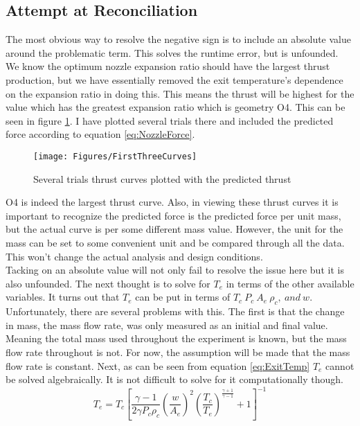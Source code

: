 \subsection{Attempt at Reconciliation}
The most obvious way to resolve the negative sign is to include an absolute value around the problematic term. This solves the runtime error, but is unfounded. We know the optimum nozzle expansion ratio should have the largest thrust production, but we have essentially removed the exit temperature's dependence on the expansion ratio in doing this. This means the thrust will be highest for the value which has the greatest expansion ratio which is geometry O4. This can be seen in figure \ref{fig:FirstThreeCurves}. I have plotted several trials there and included the predicted force according to equation \ref{eq:NozzleForce}.
\begin{figure}[h!]
\centering
\texttt{[image: Figures/FirstThreeCurves]}
\caption{Several trials thrust curves plotted with the predicted thrust}
\label{fig:FirstThreeCurves}
\end{figure}
O4 is indeed the largest thrust curve. Also, in viewing these thrust curves it is important to recognize the predicted force is the predicted force per unit mass, but the actual curve is per some different mass value. However, the unit for the mass can be set to some convenient unit and be compared through all the data. This won't change the actual analysis and design conditions.\\
Tacking on an absolute value will not only fail to resolve the issue here but it is also unfounded. The next thought is to solve for $T_e$ in terms of the other available variables. It turns out that $T_e$ can be put in terms of $T_c\ P_c\ A_e\ \rho_c,\ and\ w$.%
Unfortunately, there are several problems with this. The first is that the change in mass, the mass flow rate, was only measured as an initial and final value. Meaning the total mass used throughout the experiment is known, but the mass flow rate throughout is not. For now, the assumption will be made that the mass flow rate is constant. Next, as can be seen from equation \ref{eq:ExitTemp} $T_e$ cannot be solved algebraically. It is not difficult to solve for it computationally though. 
\begin{equation}\label{eq:ExitTemp}
T_e = T_c\left[\frac{\gamma -1}{2\gamma P_c \rho_c} \left(\frac{w}{A_e}\right)^2\left(\frac{T_c}{T_e}\right)^{\frac{\gamma+1}{\gamma-1}}+1\right]^{-1}
\end{equation}
